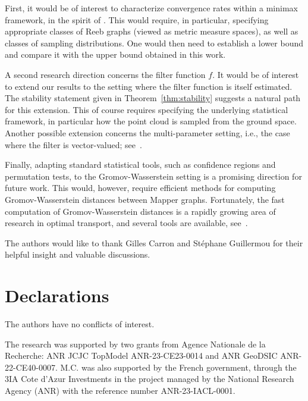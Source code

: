 \documentclass[pdflatex,sn-mathphys-ay]{sn-jnl}%
\newcommand{\change}[1]{\noindent #1}
\theoremstyle{thmstyleone}%
\begin{document}
\change{
First, it would be of interest to characterize convergence rates within a minimax framework, in the spirit of \citet{carriere2018statistical}. This would require, in particular, specifying appropriate classes of Reeb graphs (viewed as metric measure spaces), as well as classes of sampling distributions. One would then need to establish a lower bound and compare it with the upper bound obtained in this work.
}

\change{
A second research direction concerns the filter function \(f\). It would be of interest to extend our results to the setting where the filter function is itself estimated. The stability statement given in Theorem~\ref{thm:stability} suggests a natural path for this extension. This of course requires specifying the underlying statistical framework, in particular how the point cloud is sampled from the ground space.
Another possible extension concerns the multi-parameter setting, i.e., the case where the filter is vector-valued; see~\citet{carriere2022statistical}.
}

\change{
Finally, adapting standard statistical tools, such as confidence regions and permutation tests, to the Gromov-Wasserstein setting is a promising direction for future work. This would, however, require efficient methods for computing Gromov-Wasserstein distances between Mapper graphs. Fortunately, the fast computation of Gromov-Wasserstein distances is a rapidly growing area of research in optimal transport, and several tools are available, see~\citet{kerdoncuff2021sampled}.
}

\backmatter




The authors would like to thank Gilles Carron and St\'ephane Guillermou for their helpful insight and valuable discussions.



\section*{Declarations}


The authors have no conflicts of interest.


The research was supported by two grants from Agence Nationale de la Recherche: ANR JCJC TopModel ANR-23-CE23-0014 and ANR GeoDSIC ANR-22-CE40-0007.
M.C. was also supported by the French government, through the 3IA Cote d'Azur Investments in the project
managed by the National Research Agency (ANR) with the reference number ANR-23-IACL-0001.
\end{document}
